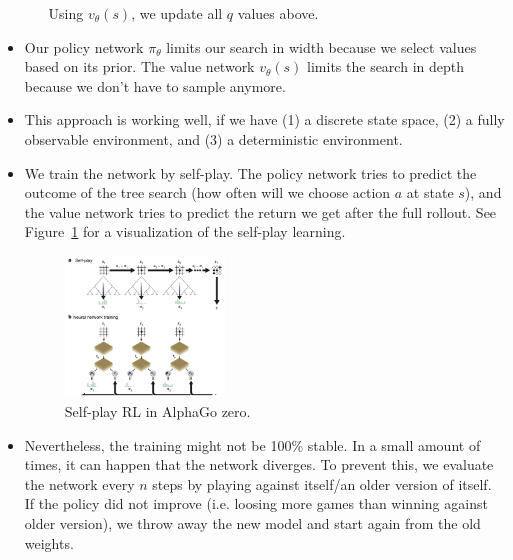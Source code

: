 \begin{itemize}
\begin{enumerate}
		Using $v_{\theta}(s)$, we update all $q$ values above.
	\end{enumerate}  
	\item Our policy network $\pi_{\theta}$ limits our search in width because we select values based on its prior. The value network $v_{\theta}(s)$ limits the search in depth because we don't have to sample anymore.
	\item This approach is working well, if we have (1) a discrete state space, (2) a fully observable environment, and (3) a deterministic environment.
	\item We train the network by self-play. The policy network tries to predict the outcome of the tree search (how often will we choose action $a$ at state $s$), and the value network tries to predict the return we get after the full rollout. See Figure~\ref{fig:rl_model_based_alphago_zero_selfplay} for a visualization of the self-play learning.
	\begin{figure}[ht!]
		\centering
		\includegraphics[width=0.4\textwidth]{figures/rl_model_based_alphago_zero_selfplay.png}
		\caption{Self-play RL in AlphaGo zero.}
		\label{fig:rl_model_based_alphago_zero_selfplay}
	\end{figure}
	\item Nevertheless, the training might not be 100\% stable. In a small amount of times, it can happen that the network diverges. To prevent this, we evaluate the network every $n$ steps by playing against itself/an older version of itself. If the policy did not improve (i.e. loosing more games than winning against older version), we throw away the new model and start again from the old weights. 
\end{itemize}